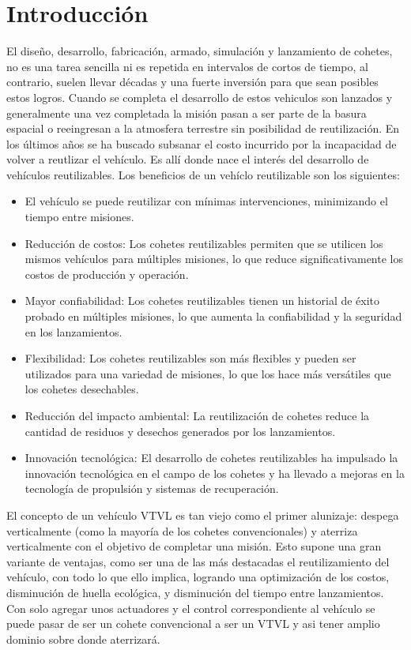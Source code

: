
\section{Introducción}
El diseño, desarrollo, fabricación, armado, simulación y lanzamiento de cohetes, no es una tarea
sencilla ni es repetida en intervalos de cortos de tiempo, al contrario, suelen llevar décadas y una
fuerte inversión para que sean posibles estos logros. Cuando se completa el desarrollo de estos vehiculos son lanzados y generalmente una vez completada la misión pasan a ser parte de la basura espacial o reeingresan a la atmosfera terrestre sin posibilidad de reutilización. En los últimos años se ha buscado subsanar el costo incurrido por la incapacidad de volver a reutlizar el vehículo. Es allí donde nace el interés del desarrollo de vehículos reutilizables. Los beneficios de un vehíclo reutilizable son los siguientes:

\begin{itemize}
    \item El vehículo se puede reutilizar con mínimas intervenciones, minimizando el tiempo entre misiones.
    \item Reducción de costos: Los cohetes reutilizables permiten que se utilicen los mismos vehículos para múltiples misiones, lo que reduce significativamente los costos de producción y operación.
    \item Mayor confiabilidad: Los cohetes reutilizables tienen un historial de éxito probado en múltiples misiones, lo que aumenta la confiabilidad y la seguridad en los lanzamientos.
    \item Flexibilidad: Los cohetes reutilizables son más flexibles y pueden ser utilizados para una variedad de misiones, lo que los hace más versátiles que los cohetes desechables.
    \item Reducción del impacto ambiental: La reutilización de cohetes reduce la cantidad de residuos y desechos generados por los lanzamientos.
    \item Innovación tecnológica: El desarrollo de cohetes reutilizables ha impulsado la innovación tecnológica en el campo de los cohetes y ha llevado a mejoras en la tecnología de propulsión y sistemas de recuperación.
\end{itemize}

\medskip

\medskip

El concepto de un vehículo VTVL es tan viejo como el primer alunizaje: despega verticalmente (como la mayoría de los cohetes
convencionales) y aterriza verticalmente con el objetivo de completar una misión. Esto supone una gran variante de ventajas, como ser una de
las más destacadas el reutilizamiento del vehículo, con todo lo que ello implica, logrando una
optimización de los costos, disminución de huella ecológica, y disminución del tiempo entre lanzamientos. Con solo agregar unos actuadores y el control correspondiente al vehículo se puede pasar de ser un cohete convencional a ser un VTVL y asi tener amplio dominio sobre donde aterrizará.

